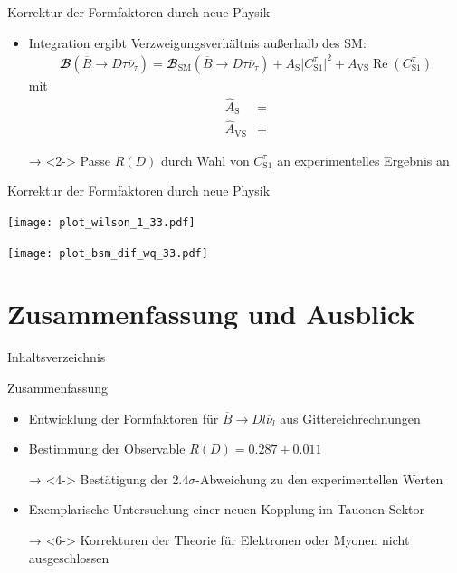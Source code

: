 \documentclass[fleqn, aspectratio=1610, professionalfonts, 9pt]{beamer}
\begin{document}
\begin{frame}{Korrektur der Formfaktoren durch neue Physik}
  \begin{itemize}
    \setlength\itemsep{1em}
    \item<1-> Integration ergibt Verzweigungsverhältnis außerhalb des SM:
    \begin{align*}
        {\mathbfcal{B}}\!\left(\overline{B} \to D \tau \overline{\nu}_\tau \right) = {\mathbfcal{B}}_\text{SM}\!\left(\overline{B} \to D \tau \overline{\nu}_\tau \right) + A_\text{S} \lvert C_{\text{S}1}^{\tau} \rvert^2 + A_{\text{VS}} \operatorname{Re}(C_{\text{S}1}^{\tau})
    \end{align*}
    mit
    \begin{align*}
      \hat{A}_\text{S} &=  \\
      \hat{A}_{\text{VS}} &= 
    \end{align*}
    \item[→]<2-> Passe $R(D)$ durch Wahl von $C_{\text{S}1}^\tau$ an experimentelles Ergebnis an
  \end{itemize}
\end{frame}


\begin{frame}{Korrektur der Formfaktoren durch neue Physik}
  \begin{minipage}{7.4cm}
      \texttt{[image: plot\_wilson\_1\_33.pdf]}
  \end{minipage}
  \begin{minipage}{7.4cm}
      \texttt{[image: plot\_bsm\_dif\_wq\_33.pdf]}
  \end{minipage}%
\end{frame}


\section{Zusammenfassung und Ausblick}

\begin{frame}{Inhaltsverzeichnis}
  \tableofcontents[currentsection,currentsubsection,
      hideothersubsections,
      sectionstyle=show/shaded,
  ]\end{frame}

\begin{frame}{Zusammenfassung}
  \begin{itemize}
    \setlength\itemsep{1em}
    \item<2-> Entwicklung der Formfaktoren für $\overline{B} \to D l \overline{\nu}_l$ aus Gittereichrechnungen
    \item<3-> Bestimmung der Observable $R(D) = \num{0.287} \pm \num{0.011}$
    \item[→]<4-> Bestätigung der $\num{2.4}\sigma$-Abweichung zu den experimentellen Werten
    \item<5-> Exemplarische Untersuchung einer neuen Kopplung im Tauonen-Sektor
    \item[→]<6-> Korrekturen der Theorie für Elektronen oder Myonen nicht ausgeschlossen
  \end{itemize}
\end{frame}
\end{document}
